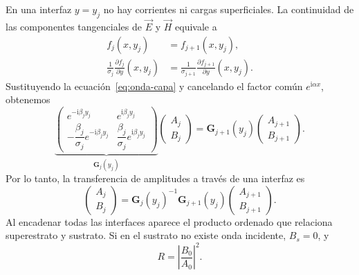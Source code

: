 \documentclass[10pt,a4paper]{article}
\newcommand{\ii}{\mathrm{i}}
\newcommand{\B}{\mathbf{B}}
\newcommand{\vE}{\vec{E}}
\newcommand{\vH}{\vec{H}}
\begin{document}
En una interfaz $y=y_j$ no hay corrientes ni cargas superficiales. La continuidad de las componentes tangenciales de $\vE$ y $\vH$ equivale a
\begin{align}
f_j(x,y_j)&=f_{j+1}(x,y_j),\\
\frac{1}{\sigma_j}\frac{\partial f_j}{\partial y}(x,y_j)
&=\frac{1}{\sigma_{j+1}}\frac{\partial f_{j+1}}{\partial y}(x,y_j).
\label{eq:borde}
\end{align}
Sustituyendo la ecuaci\'on~\eqref{eq:onda-capa} y cancelando el factor com\'un $e^{\ii\alpha x}$, obtenemos
\begin{equation}
\underbrace{\begin{pmatrix}
e^{-\ii\beta_j y_j}&e^{\ii\beta_j y_j}\\[2pt]
-\dfrac{\beta_j}{\sigma_j}e^{-\ii\beta_j y_j}&
\dfrac{\beta_j}{\sigma_j}e^{\ii\beta_j y_j}
\end{pmatrix}}_{\mathbf{G}_j(y_j)}
\begin{pmatrix}A_j\\B_j\end{pmatrix}
=
\mathbf{G}_{j+1}(y_j)
\begin{pmatrix}A_{j+1}\\B_{j+1}\end{pmatrix}.
\label{eq:interfaz-matricial}
\end{equation}
Por lo tanto, la transferencia de amplitudes a trav\'es de una interfaz es
\begin{equation}
\begin{pmatrix}A_j\\B_j\end{pmatrix}
=\mathbf{G}_j(y_j)^{-1}\mathbf{G}_{j+1}(y_j)
\begin{pmatrix}A_{j+1}\\B_{j+1}\end{pmatrix}.
\label{eq:transferencia-interfaz}
\end{equation}
Al encadenar todas las interfaces aparece el producto ordenado que relaciona superestrato y sustrato. Si en el sustrato no existe onda incidente, $B_s=0$, y
\begin{equation}
R=\left|\frac{B_0}{A_0}\right|^2.
\label{eq:R-amplitudes}
\end{equation}
\end{document}
